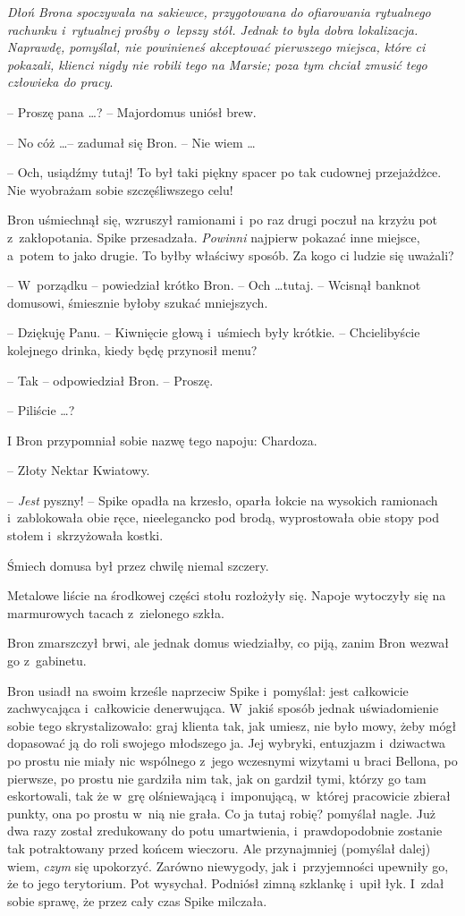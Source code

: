 \documentclass[oneside,polish,11pt,rmheadings]{mwbk}
\begin{document}
\textit{Dłoń Brona spoczywała na sakiewce, przygotowana do ofiarowania rytualnego rachunku i~rytualnej prośby o~lepszy stół. Jednak to była dobra lokalizacja. }\textit{Naprawdę, pomyślał, nie powinieneś akceptować pierwszego miejsca, które ci pokazali, klienci nigdy nie robili tego na Marsie; poza tym chciał zmusić tego człowieka do pracy}. 

-- Proszę pana  \ldots  ? -- Majordomus uniósł brew. 

-- No cóż \ldots  -- zadumał się Bron. -- Nie wiem \ldots   

-- Och, usiądźmy tutaj! To był taki piękny spacer po tak cudownej przejażdżce. Nie wyobrażam sobie szczęśliwszego celu! 

Bron uśmiechnął się, wzruszył ramionami i~po raz drugi poczuł na krzyżu pot z~zakłopotania. Spike przesadzała. \textit{Powinni }najpierw pokazać inne miejsce, a~potem to jako drugie. To byłby właściwy sposób. Za kogo ci ludzie się uważali? 

-- W~porządku -- powiedział krótko Bron. -- Och \ldots  tutaj. -- Wcisnął banknot domusowi, śmiesznie byłoby szukać mniejszych. 

-- Dziękuję Panu. -- Kiwnięcie głową i~uśmiech były krótkie. -- Chcielibyście kolejnego drinka, kiedy będę przynosił menu?  

-- Tak -- odpowiedział Bron. -- Proszę. 

-- Piliście  \ldots  ?  

I Bron przypomniał sobie nazwę tego napoju: Chardoza. 

-- Złoty Nektar Kwiatowy. 

-- \textit{Jest }pyszny! -- Spike opadła na krzesło, oparła łokcie na wysokich ramionach i~zablokowała obie ręce, nieelegancko pod brodą, wyprostowała obie stopy pod stołem i~skrzyżowała kostki. 

Śmiech domusa był przez chwilę niemal szczery. 

Metalowe liście na środkowej części stołu rozłożyły się. Napoje wytoczyły się na marmurowych tacach z~zielonego szkła. 

Bron zmarszczył brwi, ale jednak domus wiedziałby, co piją, zanim Bron wezwał go z~gabinetu. 

Bron usiadł na swoim krześle naprzeciw Spike i~pomyślał: jest całkowicie zachwycająca i~całkowicie denerwująca. W~jakiś sposób jednak uświadomienie sobie tego skrystalizowało: graj klienta tak, jak umiesz, nie było mowy, żeby mógł dopasować ją do roli swojego młodszego ja. Jej wybryki, entuzjazm i~dziwactwa po prostu nie miały nic wspólnego z~jego wczesnymi wizytami u braci Bellona, po pierwsze, po prostu nie gardziła nim tak, jak on gardził tymi, którzy go tam eskortowali, tak że w~grę olśniewającą i~imponującą, w~której pracowicie zbierał punkty, ona po prostu w~nią nie grała. Co ja tutaj robię? pomyślał nagle. Już dwa razy został zredukowany do potu umartwienia, i~prawdopodobnie zostanie tak potraktowany przed końcem wieczoru. Ale przynajmniej (pomyślał dalej) wiem, \textit{czym }się upokorzyć. Zarówno niewygody, jak i~przyjemności upewniły go, że to jego terytorium. Pot wysychał. Podniósł zimną szklankę i~upił łyk. I~zdał sobie sprawę, że przez cały czas Spike milczała. 
\end{document}
